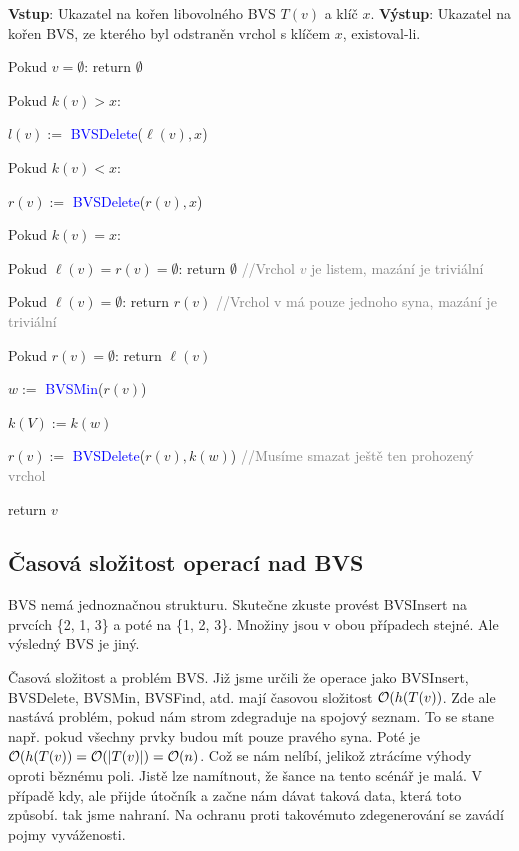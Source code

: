 \noindent \textbf{Vstup}: Ukazatel na kořen libovolného BVS $T(v)$ a klíč $x$. \newline
\noindent \textbf{Výstup}: Ukazatel na kořen BVS, ze kterého byl odstraněn vrchol s
klíčem $x$, existoval-li. \newline
{}
\begin{pseudocode}
    \item Pokud $v = \emptyset$: return $\emptyset$
    \item Pokud $k(v) > x$: 
    \item \tab $l(v) := $ \textcolor{blue}{BVSDelete}($\ell(v), x$)
    \item Pokud $k(v) < x$:
    \item \tab $r(v) := $ \textcolor{blue}{BVSDelete}($r(v), x$)
    \item Pokud $k(v) = x$:
    \item \tab Pokud $\ell(v) = r(v) = \emptyset$: return $\emptyset$ \textcolor{gray}{//Vrchol $v$ je listem, mazání je triviální}
    \item \tab Pokud $\ell(v) = \emptyset$: return $r(v)$ \textcolor{gray}{//Vrchol v má pouze jednoho syna, mazání je triviální}
    \item \tab Pokud $r(v) = \emptyset$: return $\ell(v)$
    \item \tab $w :=$ \textcolor{blue}{BVSMin}($r(v)$)
    \item \tab $k(V) := k(w)$
    \item \tab $r(v) := $ \textcolor{blue}{BVSDelete}($r(v), k(w)$) \textcolor{gray}{//Musíme smazat ještě ten prohozený vrchol}
    \item return $v$
\end{pseudocode} \bigskip

\subsection{Časová složitost operací nad BVS}

\begin{remark}
BVS nemá jednoznačnou strukturu. Skutečne zkuste provést BVSInsert na prvcích \{2, 1, 3\} a poté na \{1, 2, 3\}. Množiny jsou v obou případech stejné. Ale výsledný BVS je jiný.\bigskip
\end{remark}

\noindent Časová složitost a problém BVS. Již jsme určili že operace jako BVSInsert, BVSDelete, BVSMin, BVSFind, atd. mají časovou složitost $\mathcal{O}(h(T(v))$. Zde ale nastává problém, pokud nám strom zdegraduje na spojový seznam. To se stane např. pokud všechny prvky budou mít pouze pravého syna. Poté je $\mathcal{O}(h(T(v)) = \mathcal{O}(|T(v)|) = \mathcal{O}(n)$. Což se nám nelíbí, jelikož ztrácíme výhody oproti běznému poli. Jistě lze namítnout, že šance na tento scénář je malá. V případě kdy, ale přijde útočník a začne nám dávat taková data, která toto způsobí. tak jsme nahraní. Na ochranu proti takovémuto zdegenerování se zavádí pojmy vyváženosti. \bigskip

